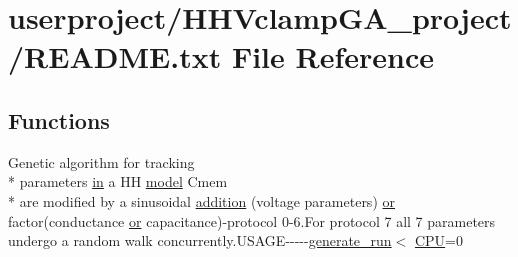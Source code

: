 \hypertarget{userproject_2HHVclampGA__project_2README_8txt}{\section{userproject/\+H\+H\+Vclamp\+G\+A\+\_\+project/\+R\+E\+A\+D\+M\+E.txt File Reference}
\label{userproject_2HHVclampGA__project_2README_8txt}
}
\subsection*{Functions}
\begin{DoxyCompactItemize}
\item 
Genetic algorithm for tracking \\*
parameters \hyperlink{README_8txt_a148897a6b2cc9cff25af80abb13426b0}{in} a H\+H \hyperlink{README_8txt_a69fd801b7213948c12d9dd7eebb3ed14}{model} Cmem \\*
are modified by a sinusoidal \hyperlink{userproject_2HHVclampGA__project_2README_8txt_aec7fa7af1db4edca5dd1a6356f9f8eae}{addition} (voltage parameters) \hyperlink{userproject_2PoissonIzh__project_2README_8txt_ad4021097ab0ba066271614bf3f4c2e27}{or} factor(conductance \hyperlink{userproject_2PoissonIzh__project_2README_8txt_ad4021097ab0ba066271614bf3f4c2e27}{or} capacitance)-\/protocol 0-\/6.For protocol 7 all 7 parameters undergo a random walk concurrently.\+U\+S\+A\+G\+E-\/-\/-\/-\/-\/\hyperlink{userproject_2MBody__userdef__project_2README_8txt_a320a215d1e27b4de394be70e90d22863}{generate\+\_\+run}$<$ \hyperlink{README_8txt_a74a069e3c75797de2636c4dd14daa147}{C\+P\+U}=0
\end{DoxyCompactItemize}
